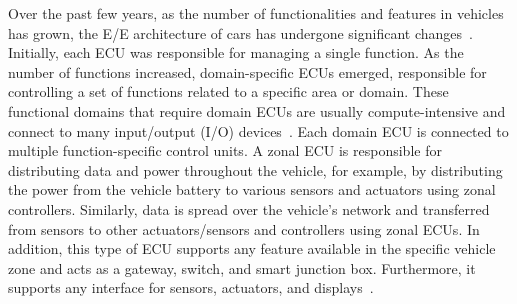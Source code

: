     
    
    Over the past few years, as the number of functionalities and features in vehicles has grown, the E/E architecture of cars has undergone significant changes~\cite{9212001}. Initially, each ECU was responsible for managing a single function. As the number of functions increased, domain-specific ECUs emerged, responsible for controlling a set of functions related to a specific area or domain. These functional domains that require domain ECUs are usually compute-intensive and connect to many input/output (I/O) devices~\cite{9613692}. Each domain ECU is connected to multiple function-specific control units. A zonal ECU is responsible for distributing data and power throughout the vehicle, for example, by distributing the power from the vehicle battery to various sensors and actuators using zonal controllers.
    Similarly, data is spread over the vehicle's network and transferred from sensors to other actuators/sensors and controllers using zonal ECUs. In addition, this type of ECU supports any feature available in the specific vehicle zone and acts as a gateway, switch, and smart junction box. Furthermore, it supports any interface for sensors, actuators, and displays~\cite{askaripoor2023designer, askaripoor2022architecture}.
    
    
    
